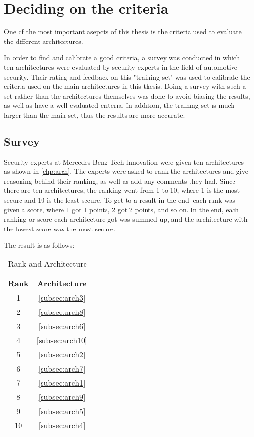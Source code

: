 \chapter{Deciding on the criteria}
\label{chp:criteria}

One of the most important asepcts of this thesis is the criteria used to evaluate the different architectures.

In order to find and calibrate a good criteria, a survey was conducted in which ten architectures were evaluated by security experts in the field of automotive security.
Their rating and feedback on this "training set" was used to calibrate the criteria used on the main architectures in this thesis.
Doing a survey with such a set rather than the architectures themselves was done to avoid biasing the results, as well as have a well evaluated criteria.
In addition, the training set is much larger than the main set, thus the results are more accurate.

\section{Survey}
\label{sec:survey}

Security experts at Mercedes-Benz Tech Innovation were given ten architectures as shown in \ref{chp:arch}.
The experts were asked to rank the architectures and give reasoning behind their ranking, as well as add any comments they had.
Since there are ten architectures, the ranking went from 1 to 10, where 1 is the most secure and 10 is the least secure.
To get to a result in the end, each rank was given a score, where 1 got 1 points, 2 got 2 points, and so on.
In the end, each ranking or score each architecture got was summed up, and the architecture with the lowest score was the most secure.

The result is as follows:

\begin{table}[h]
    \centering
    \caption{Rank and Architecture}
    \begin{tabular}{ |c|c| } 
    \hline
    Rank & Architecture \\
    \hline
    1 & \ref{subsec:arch3} \\
    2 & \ref{subsec:arch8} \\
    3 & \ref{subsec:arch6} \\
    4 & \ref{subsec:arch10} \\
    5 & \ref{subsec:arch2} \\
    6 & \ref{subsec:arch7} \\
    7 & \ref{subsec:arch1} \\
    8 & \ref{subsec:arch9} \\
    9 & \ref{subsec:arch5} \\
    10 & \ref{subsec:arch4} \\
    \hline
    \end{tabular}
\end{table}

